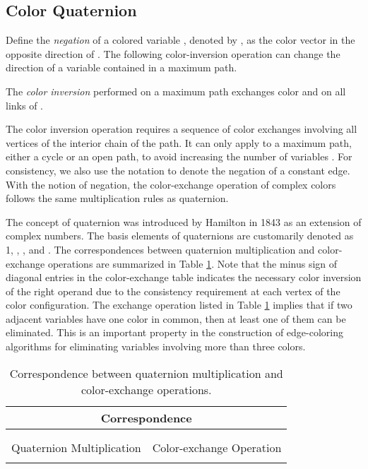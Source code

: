 \documentclass[11pt]{article}
\newenvironment{definition}[1][Definition]{\begin{trivlist}
\item[\hskip \labelsep {\bfseries #1}]}{\end{trivlist}}
\begin{document}
\subsection{Color Quaternion}
Define the {\it negation} of a colored variable , denoted by , as the color vector in the opposite direction of . The following color-inversion operation can change the direction of a  variable contained in a maximum  path.

\begin{definition}
\label{definition:colorinversion}
The {\it color inversion} performed on a maximum  path  exchanges color  and  on all links of .
\end{definition}

The color inversion operation requires a sequence of color exchanges involving all vertices of the interior chain of the  path. It can only apply to a maximum  path, either a  cycle or an open  path, to avoid increasing the number of variables . For consistency, we also use the notation  to denote the negation of a constant edge. With the notion of negation, the color-exchange operation of complex colors follows the same multiplication rules as quaternion.

The concept of quaternion was introduced by Hamilton in 1843 \cite{conway2003quaternions} as an extension of complex numbers. The basis elements of quaternions are customarily denoted as 1, , , and . The correspondences between quaternion multiplication and color-exchange operations are summarized in Table \ref{tab:Quaternion}. Note that the minus sign of diagonal entries in the color-exchange table indicates the necessary color inversion of the right operand due to the consistency requirement at each vertex of the color configuration. The exchange operation listed in Table \ref{tab:Quaternion} implies that if two adjacent variables have one color in common, then at least one of them can be eliminated. This is an important property in the construction of edge-coloring algorithms for eliminating variables involving more than three colors. 


\begin{table}[htbp]
	\centering
{\footnotesize
\begin{tabular}{|c|c|} \hline
\multicolumn{2}{|c|}{Correspondence} \\ \hline
\multicolumn{2}{|c|}{
} \\
\multicolumn{2}{|c|}{
} 
\\ \hline

Quaternion Multiplication & Color-exchange Operation \\ \hline
 & 
																		
																		 \\ 
\hline
\end{tabular}
}
\caption{Correspondence between quaternion multiplication and color-exchange operations.}
	\label{tab:Quaternion}
\end{table}
\end{document}
